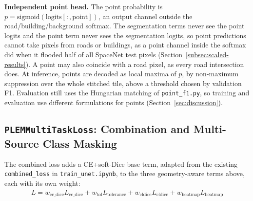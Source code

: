 \textbf{Independent point head.} The point probability is
$p = \mathrm{sigmoid}(\mathrm{logits}[:, \mathrm{point}])$, an output channel outside the
road/building/background softmax. The segmentation terms never see the point logits and the point
term never sees the segmentation logits, so point predictions cannot take pixels from roads or
buildings, as a point channel inside the softmax did when it flooded half of all SpaceNet test
pixels (Section~\ref{subsec:scaled-results}). A point may also coincide with a road pixel, as every
road intersection does. At inference, points are decoded as local maxima of $p$, by non-maximum
suppression over the whole stitched tile, above a threshold chosen by validation F1. Evaluation
still uses the Hungarian matching of \texttt{point\_f1.py}, so training and evaluation use
different formulations for points (Section~\ref{sec:discussion}).

\subsection{\texttt{PLEMMultiTaskLoss}: Combination and Multi-Source Class Masking}
\label{subsec:multitask-loss}

The combined loss adds a CE+soft-Dice base term, adapted from the existing
\texttt{combined\_loss} in \texttt{train\_unet.ipynb}, to the three geometry-aware terms above, each
with its own weight:
\begin{align}
  L = w_{\mathrm{ce\_dice}} L_{\mathrm{ce\_dice}} + w_{\mathrm{tol}} L_{\mathrm{tolerance}} +
      w_{\mathrm{cldice}} L_{\mathrm{cldice}} + w_{\mathrm{heatmap}} L_{\mathrm{heatmap}}
\end{align}

